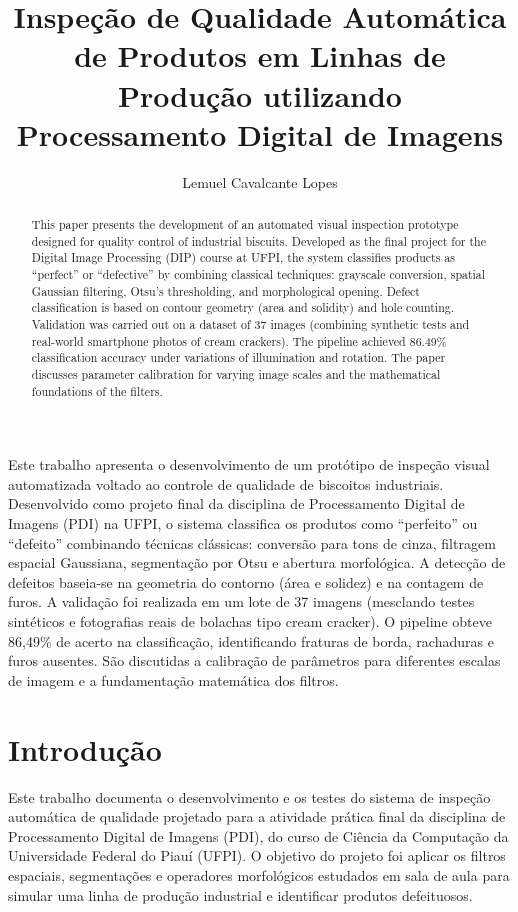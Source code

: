 \documentclass[12pt]{article}
\title{Inspeção de Qualidade Automática de Produtos em Linhas de Produção utilizando Processamento Digital de Imagens}
\author{Lemuel Cavalcante Lopes\inst{1}}
\begin{document}
 

\maketitle

\begin{abstract}
This paper presents the development of an automated visual inspection prototype designed for quality control of industrial biscuits. Developed as the final project for the Digital Image Processing (DIP) course at UFPI, the system classifies products as ``perfect'' or ``defective'' by combining classical techniques: grayscale conversion, spatial Gaussian filtering, Otsu's thresholding, and morphological opening. Defect classification is based on contour geometry (area and solidity) and hole counting. Validation was carried out on a dataset of 37 images (combining synthetic tests and real-world smartphone photos of cream crackers). The pipeline achieved 86.49\% classification accuracy under variations of illumination and rotation. The paper discusses parameter calibration for varying image scales and the mathematical foundations of the filters.
\end{abstract}
     
\begin{resumo} 
Este trabalho apresenta o desenvolvimento de um protótipo de inspeção visual automatizada voltado ao controle de qualidade de biscoitos industriais. Desenvolvido como projeto final da disciplina de Processamento Digital de Imagens (PDI) na UFPI, o sistema classifica os produtos como ``perfeito'' ou ``defeito'' combinando técnicas clássicas: conversão para tons de cinza, filtragem espacial Gaussiana, segmentação por Otsu e abertura morfológica. A detecção de defeitos baseia-se na geometria do contorno (área e solidez) e na contagem de furos. A validação foi realizada em um lote de 37 imagens (mesclando testes sintéticos e fotografias reais de bolachas tipo cream cracker). O pipeline obteve 86,49\% de acerto na classificação, identificando fraturas de borda, rachaduras e furos ausentes. São discutidas a calibração de parâmetros para diferentes escalas de imagem e a fundamentação matemática dos filtros.
\end{resumo}

\section{Introdução}

Este trabalho documenta o desenvolvimento e os testes do sistema de inspeção automática de qualidade projetado para a atividade prática final da disciplina de Processamento Digital de Imagens (PDI), do curso de Ciência da Computação da Universidade Federal do Piauí (UFPI). O objetivo do projeto foi aplicar os filtros espaciais, segmentações e operadores morfológicos estudados em sala de aula para simular uma linha de produção industrial e identificar produtos defeituosos.
\end{document}
